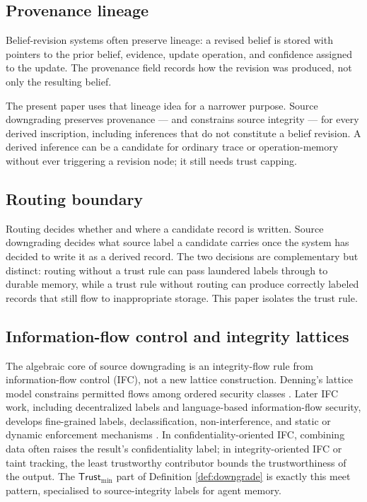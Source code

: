 \documentclass[11pt]{article}
\newcommand{\Trust}{\mathsf{Trust}}
\begin{document}
\subsection{Provenance lineage}

Belief-revision systems often preserve lineage: a revised belief is stored with pointers to the prior belief, evidence, update operation, and confidence assigned to the update. The provenance field records how the revision was produced, not only the resulting belief.

The present paper uses that lineage idea for a narrower purpose. Source downgrading preserves provenance --- and constrains source integrity --- for every derived inscription, including inferences that do not constitute a belief revision. A derived inference can be a candidate for ordinary trace or operation-memory without ever triggering a revision node; it still needs trust capping.

\subsection{Routing boundary}

Routing decides whether and where a candidate record is written. Source downgrading decides what source label a candidate carries once the system has decided to write it as a derived record. The two decisions are complementary but distinct: routing without a trust rule can pass laundered labels through to durable memory, while a trust rule without routing can produce correctly labeled records that still flow to inappropriate storage. This paper isolates the trust rule.

\subsection{Information-flow control and integrity lattices}

The algebraic core of source downgrading is an integrity-flow rule from information-flow control (IFC), not a new lattice construction. Denning's lattice model constrains permitted flows among ordered security classes \cite{Denning1976}. Later IFC work, including decentralized labels and language-based information-flow security, develops fine-grained labels, declassification, non-interference, and static or dynamic enforcement mechanisms \cite{MyersLiskov1997,SabelfeldMyers2003}. In confidentiality-oriented IFC, combining data often raises the result's confidentiality label; in integrity-oriented IFC or taint tracking, the least trustworthy contributor bounds the trustworthiness of the output. The $\Trust_{\min}$ part of Definition \ref{def:downgrade} is exactly this meet pattern, specialised to source-integrity labels for agent memory.
\end{document}
